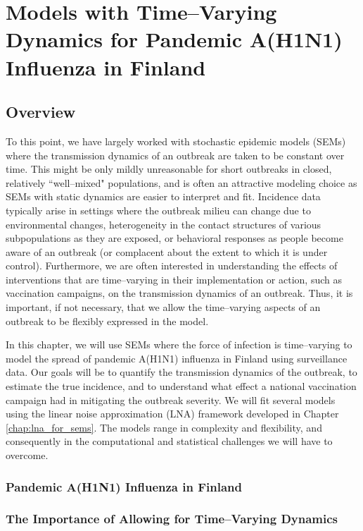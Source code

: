 \chapter{Models with Time--Varying Dynamics for Pandemic A(H1N1) Influenza in Finland}
\label{chap:lna_extensions}

\section{Overview}
\label{sec:lna_extensions_overview}
To this point, we have largely worked with stochastic epidemic models (SEMs) where the transmission dynamics of an outbreak are taken to be constant over time. This might be only mildly unreasonable for short outbreaks in closed, relatively ``well--mixed" populations, and is often an attractive modeling choice as SEMs with static dynamics are easier to interpret and fit. Incidence data typically arise in settings where the outbreak milieu can change due to environmental changes, heterogeneity in the contact structures of various subpopulations as they are exposed, or behavioral responses as people become aware of an outbreak (or complacent about the extent to which it is under control). Furthermore, we are often interested in understanding the effects of interventions that are time--varying in their implementation or action, such as vaccination campaigns, on the transmission dynamics of an outbreak. Thus, it is important, if not necessary, that we allow the time--varying aspects of an outbreak to be flexibly expressed in the model.

In this chapter, we will use SEMs where the force of infection is time--varying to model the spread of pandemic A(H1N1) influenza in Finland using surveillance data. Our goals will be to quantify the transmission dynamics of the outbreak, to estimate the true incidence, and to understand what effect a national vaccination campaign had in mitigating the outbreak severity. We will fit several models using the linear noise approximation (LNA) framework developed in Chapter \ref{chap:lna_for_sems}. The models range in complexity and flexibility, and consequently in the computational and statistical challenges we will have to overcome.

\subsection{Pandemic A(H1N1) Influenza in Finland}
\label{subsec:flu_description}

\subsection{The Importance of Allowing for Time--Varying Dynamics}
\label{subsec:tparam_motivation}

